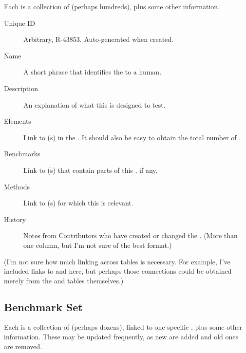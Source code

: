Each \Refset is a collection of \Elements (perhaps hundreds), plus some other information.

\begin{description}
    \item[Unique ID] Arbitrary, \eg R-43853.  Auto-generated when created.
    \item[Name] A short phrase that identifies the \Refset to a human.
    \item[Description] An explanation of what this \Refset is designed to test.
    \item[Elements] Link to \Element(s) in the \Refset.  It should also be easy to obtain the total number of \Elements.
    \item[Benchmarks] Link to \Benchmark(s) that contain parts of this \Refset, if any.
    \item[Methods] Link to \Method(s) for which this \Refset is relevant.
    \item[History] Notes from Contributors who have created or changed the \Refset.  (More than one column, but I'm not sure of the best format.)
\end{description}

(I'm not sure how much linking across tables is necessary.
For example, I've included links to \Benchmark and \Method here, but perhaps those connections could be obtained merely from the \Benchmark and \Method tables themselves.)

\subsection{Benchmark Set}
\label{sec:tables_benchmark}

Each \Benchmark is a collection of \Elements (perhaps dozens), linked to one specific \Task, plus some other information.
These may be updated frequently, as new \Elements are added and old ones are removed.

